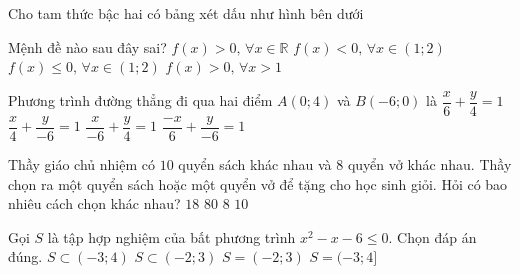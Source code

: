 \begin{ex}%
Cho tam thức bậc hai có bảng xét dấu như hình bên dưới
\begin{center}
\end{center}
Mệnh đề nào sau đây sai?
\choice
{\True $ f(x) > 0, \, \forall x \in \mathbb{R} $}
{$ f(x) < 0, \, \forall x \in (1;2) $}
{$ f(x) \le 0, \, \forall x \in (1;2) $}
{$ f(x) > 0, \, \forall x > 1 $}
\end{ex}

\begin{ex}%
Phương trình đường thẳng đi qua hai điểm $ A(0;4) $ và $ B(-6;0) $ là
\choice
{$ \dfrac{x}{6}+\dfrac{y}{4}=1 $}
{$ \dfrac{x}{4}+\dfrac{y}{-6}=1 $}
{\True $ \dfrac{x}{-6}+\dfrac{y}{4}=1 $}
{$ \dfrac{-x}{6}+\dfrac{y}{-6}=1 $}
\end{ex}

\begin{ex}%
Thầy giáo chủ nhiệm có $ 10 $ quyển sách khác nhau và $ 8 $ quyển vở khác nhau. Thầy chọn ra một quyển sách hoặc một quyển vở để tặng cho học sinh giỏi. Hỏi có bao nhiêu cách chọn khác nhau?
\choice
{\True $ 18 $}
{$ 80 $}
{$ 8 $}
{$ 10 $}
\end{ex}

\begin{ex}%
Gọi $ S $ là tập hợp nghiệm của bất phương trình $ x^{2}-x-6 \le 0 $. Chọn đáp án đúng.
\choice
{\True $ S \subset (-3;4) $}
{$ S \subset (-2;3) $}
{$ S = (-2;3) $}
{$ S = (-3;4] $}
\end{ex}

